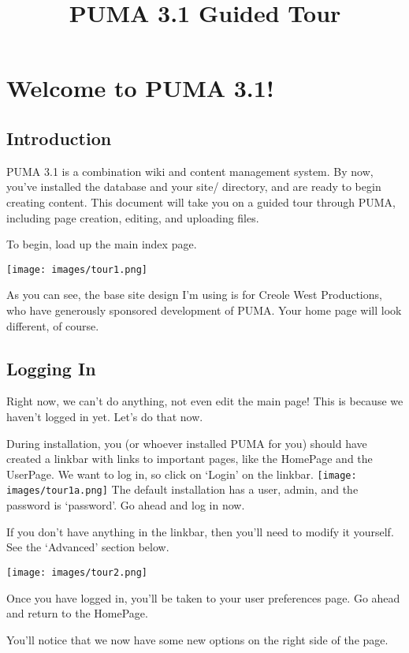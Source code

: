 \documentclass[12pt]{article}
\title{PUMA 3.1 Guided Tour}
\begin{document}
\section*{Welcome to PUMA 3.1!}

\tableofcontents

\subsection*{Introduction}

PUMA 3.1 is a combination wiki and content management system. By now, you've installed the database and your site/ directory, and are ready to begin creating content. This document will take you on a guided tour through PUMA, including page creation, editing, and uploading files.

To begin, load up the main index page.

\texttt{[image: images/tour1.png]}

As you can see, the base site design I'm using is for Creole West Productions, who have generously sponsored development of PUMA. Your home page will look different, of course.

\subsection*{Logging In}

Right now, we can't do anything, not even edit the main page! This is because we haven't logged in yet. Let's do that now.

During installation, you (or whoever installed PUMA for you) should have created a linkbar with links to important pages, like the HomePage and the UserPage.  We want to log in, so click on `Login' on the linkbar. \texttt{[image: images/tour1a.png]} The default installation has a user, admin, and the password is `password'. Go ahead and log in now.

If you don't have anything in the linkbar, then you'll need to modify it yourself.  See the `Advanced' section below.

\texttt{[image: images/tour2.png]} 

Once you have logged in, you'll be taken to your user preferences page. Go ahead and return to the HomePage.

You'll notice that we now have some new options on the right side of the page.
 
\end{document}

